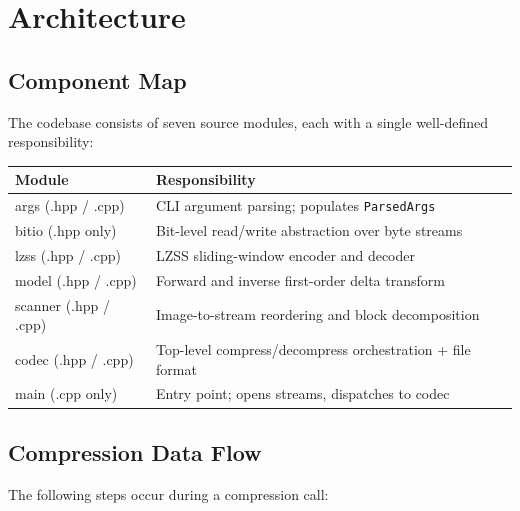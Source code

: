 \section{Architecture}

\subsection{Component Map}

The codebase consists of seven source modules, each with a single well-defined responsibility:

\begin{center}
\begin{tabular}{>{\ttfamily}l l}
\toprule
\textbf{Module} & \textbf{Responsibility} \\
\midrule
args (.hpp / .cpp)       & CLI argument parsing; populates \texttt{ParsedArgs} \\
bitio (.hpp only)        & Bit-level read/write abstraction over byte streams \\
lzss (.hpp / .cpp)       & LZSS sliding-window encoder and decoder \\
model (.hpp / .cpp)      & Forward and inverse first-order delta transform \\
scanner (.hpp / .cpp)    & Image-to-stream reordering and block decomposition \\
codec (.hpp / .cpp)      & Top-level compress/decompress orchestration + file format \\
main (.cpp only)         & Entry point; opens streams, dispatches to codec \\
\bottomrule
\end{tabular}
\end{center}

\subsection{Compression Data Flow}

The following steps occur during a compression call:

